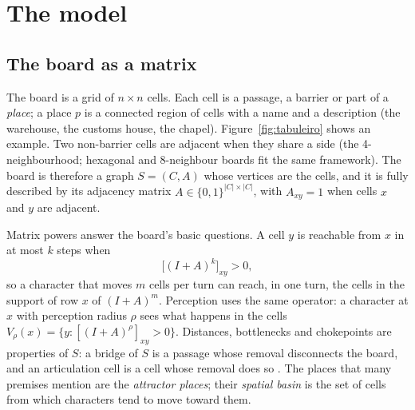 \documentclass[11pt]{article}
\begin{document}
\section{The model}

\subsection{The board as a matrix}

The board is a grid of $n \times n$ cells. Each cell is a passage, a barrier
or part of a \emph{place}; a place $p$ is a connected region of cells with a
name and a description (the warehouse, the customs house, the chapel).
Figure~\ref{fig:tabuleiro} shows an example. Two non-barrier cells are
adjacent when they share a side (the 4-neighbourhood; hexagonal and
8-neighbour boards fit the same framework). The board is therefore a graph
$S = (C, A)$ whose vertices are the cells, and it is fully described by its
adjacency matrix $A \in \{0,1\}^{|C| \times |C|}$, with $A_{xy} = 1$ when
cells $x$ and $y$ are adjacent.

Matrix powers answer the board's basic questions. A cell $y$ is reachable
from $x$ in at most $k$ steps when
\begin{equation}
  \bigl[(I + A)^k\bigr]_{xy} > 0,
\end{equation}
so a character that moves $m$ cells per turn can reach, in one turn, the
cells in the support of row $x$ of $(I+A)^m$. Perception uses the same
operator: a character at $x$ with perception radius $\rho$ sees what happens
in the cells $V_\rho(x) = \{ y : [(I + A)^\rho]_{xy} > 0 \}$. Distances,
bottlenecks and chokepoints are properties of $S$: a bridge of $S$ is a
passage whose removal disconnects the board, and an articulation cell is a
cell whose removal does so \parencite{tarjan1972}. The places that many
premises mention are the \emph{attractor places}; their \emph{spatial basin}
is the set of cells from which characters tend to move toward them.
\end{document}
